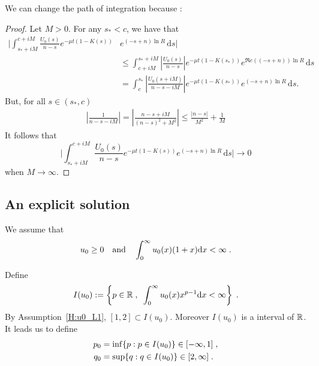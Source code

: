 \documentclass[11pt]{amsart}
\renewcommand{\Re}{\mathfrak{R}e}
\newcommand{\diff}{\,\mathrm{d}}
\begin{document}
\begin{remark}
    We can change the path of integration because : 
\end{remark}
\begin{proof}
    Let $M > 0$. For any $s_* < c$, we have that 
    \begin{align*}
        \bigg| \int_{s_*+iM}^{c+iM} \frac{U_0(s)}{n-s} e^{-\mu t(1 - K(s))} &e^{(-s+n)\ln R} \diff s \bigg|
        \\
        &\leq 
     \int_{c+iM}^{s_*+iM} \left|\frac{U_0(s)}{n-s}\right| e^{-\mu t(1 - K(s_*))} e^{\Re((-s+n))\ln R} \diff s \\
     &= 
     \int_{c}^{s_*} \left|\frac{U_0(s+iM)}{n-s-iM}\right| e^{-\mu t(1 - K(s_*))} e^{(-s+n)\ln R} \diff s.
    \end{align*}
But, for all $s \in (s_*, c)$
\begin{align*}
    \left|\frac{1}{n-s-iM}\right| = \left|\frac{n-s + iM}{(n-s)^2+M^2}\right| \leq \frac{|n-s|}{M^2} + \frac1M
\end{align*}
It follows that $$ \bigg| \int_{s_*+iM}^{c+iM} \frac{U_0(s)}{n-s} e^{-\mu t(1 - K(s))} e^{(-s+n)\ln R} \diff s \bigg| \to 0$$ when $M \to \infty$.
\end{proof}

\subsection{An explicit solution}
\label{s:explicit}

We assume that     \begin{equation}
    u_0 \geq 0 \quad \text{and} \quad \int_0^\infty u_0(x) (1+x) \mathrm dx < \infty
    \; .
    \label{H:u0_L1}
\end{equation}

Define 
\begin{equation}
    I(u_0) := \left\{ p \in \mathbb{R} \; , \enspace \int_0^\infty u_0(x) x^{p-1} \mathrm dx < \infty \right\}
    \; .
\end{equation}
By Assumption~\eqref{H:u0_L1}, $[1, 2] \subset I(u_0)$. Moreover $I(u_0)$ is a interval of $\mathbb{R}$.\\
It leads us to define
\begin{subequations}
\begin{align*}
    p_0 &= \inf \{p : p \in I(u_0) \} \in [-\infty, 1] \; ,\\
    q_0 &= \sup \{q : q \in I(u_0) \} \in [2, \infty] \; .
\end{align*}    
\end{subequations}
\end{document}
